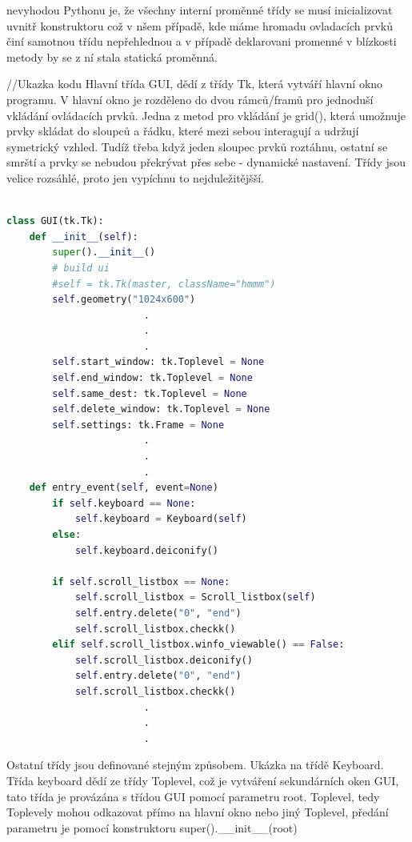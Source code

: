 nevyhodou Pythonu je, že všechny interní proměnné třídy se musí inicializovat uvnitř konstruktoru což v nšem případě, kde máme hromadu ovladacích prvků činí samotnou třídu nepřehlednou a v případě deklarovani promenné v blízkosti metody by se z ní stala statická proměnná. 

//Ukazka kodu
Hlavní třída GUI, dědí z třídy Tk, která vytváří hlavní okno programu. V hlavní okno je rozděleno do dvou rámců/framů pro jednoduší vkládání ovládacích prvků. Jedna z metod pro vkládání je grid(), která umožnuje prvky skládat do sloupců a řádku, které mezi sebou interagují a udržují symetrický vzhled. Tudíž třeba když jeden sloupec prvků roztáhnu, ostatní se smrští a prvky se nebudou překrývat přes sebe - dynamické nastavení. Třídy jsou velice rozsáhlé, proto jen vypíchnu to nejduležitějšší.
\begin{lstlisting}[language=Python, caption=Funkce stavového automatu:, frame=single, breaklines=true, postbreak=\mbox{\textcolor{gray}{$\hookrightarrow$}\space}]

class GUI(tk.Tk):
    def __init__(self):
        super().__init__()
        # build ui
        #self = tk.Tk(master, className="hmmm")
        self.geometry("1024x600")
                        .
                        .
                        .
        self.start_window: tk.Toplevel = None
        self.end_window: tk.Toplevel = None
        self.same_dest: tk.Toplevel = None
        self.delete_window: tk.Toplevel = None
        self.settings: tk.Frame = None
                        .
                        .
                        .
    def entry_event(self, event=None)
        if self.keyboard == None:
            self.keyboard = Keyboard(self)
        else:
            self.keyboard.deiconify()

        if self.scroll_listbox == None:
            self.scroll_listbox = Scroll_listbox(self)
            self.entry.delete("0", "end")
            self.scroll_listbox.checkk()
        elif self.scroll_listbox.winfo_viewable() == False:
            self.scroll_listbox.deiconify()
            self.entry.delete("0", "end")
            self.scroll_listbox.checkk()
                        .
                        .
                        .
\end{lstlisting}

Ostatní třídy jsou definované stejným způsobem. Ukázka na třídě Keyboard. Třída keyboard dědí ze třídy Toplevel, což je vytváření sekundárních oken GUI, tato třída je provázána s třídou GUI pomocí parametru root. Toplevel, tedy Toplevely mohou odkazovat přímo na hlavní okno nebo jiný Toplevel, předání parametru je pomocí konstruktoru super().\_\_init\_\_(root)

